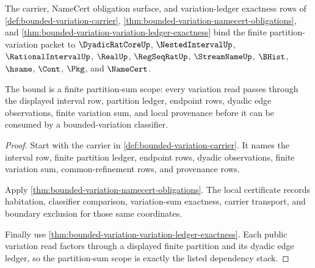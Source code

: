 \begin{theorem}
\label{thm:bounded-variation-partition-scope-binding}
The carrier, NameCert obligation surface, and variation-ledger exactness rows of \autoref{def:bounded-variation-carrier}, \autoref{thm:bounded-variation-namecert-obligations}, and \autoref{thm:bounded-variation-variation-ledger-exactness} bind the finite partition-variation packet to $\DyadicRatCoreUp$, $\NestedIntervalUp$, $\RationalIntervalUp$, $\RealUp$, $\RegSeqRatUp$, $\StreamNameUp$, $\BHist$, $\hsame$, $\Cont$, $\Pkg$, and $\NameCert$.

The bound is a finite partition-sum scope: every variation read passes through the displayed interval row, partition ledger, endpoint rows, dyadic edge observations, finite variation sum, and local provenance before it can be consumed by a bounded-variation classifier.
\end{theorem}
\begin{proof}
Start with the carrier in \autoref{def:bounded-variation-carrier}. It names the interval row, finite partition ledger, endpoint rows, dyadic observations, finite variation sum, common-refinement rows, and provenance rows.

Apply \autoref{thm:bounded-variation-namecert-obligations}. The local certificate records habitation, classifier comparison, variation-sum exactness, carrier transport, and boundary exclusion for those same coordinates.

Finally use \autoref{thm:bounded-variation-variation-ledger-exactness}. Each public variation read factors through a displayed finite partition and its dyadic edge ledger, so the partition-sum scope is exactly the listed dependency stack.
\end{proof}

